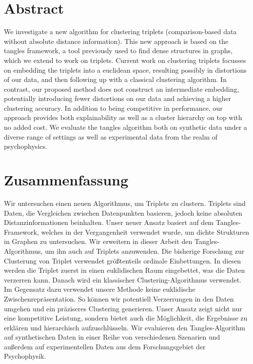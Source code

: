 \documentclass[twoside,12pt,a4paper]{report}
\begin{document}

\setcounter{page}{1}



\section*{Abstract}
We investigate a new algorithm for clustering triplets (comparison-based data 
without absolute distance information). This new approach is based on the tangles framework,
a tool previously used to find dense structures in graphs, which 
we extend to work on triplets. Current work on clustering triplets focusses
on embedding the triplets into a euclidean space, resulting possibly in distortions of our data,
and then following up with a classical clustering algorithm. In contrast, our proposed method
does not construct an intermediate embedding, potentially introducing fewer distortions
on our data and achieving a higher clustering accuracy. In addition to being
competitive in performance, our approach provides both explainability as well as a cluster 
hierarchy on top with no added cost. We evaluate the tangles algorithm both on synthetic data 
under a diverse range of settings as well as experimental data from the realm of psychophysics.

\newpage
\section*{Zusammenfassung}
Wir untersuchen einen neuen Algorithmus, um Triplets zu clustern. Triplets sind Daten, die 
Vergleichen zwischen Datenpunkten basieren, jedoch keine absoluten Distanzinformationen beinhalten. Unser neuer Ansatz basiert
auf dem Tangles-Framework, welches in der Vergangenheit verwendet wurde, um dichte Strukturen in Graphen 
zu untersuchen. Wir erweitern in dieser Arbeit den Tangles-Algorithmus, um ihn auch auf Triplets anzuwenden.
Die bisherige Forschung zur Clusterung von Triplet verwendet größtenteils ordinale Einbettungen. In diesen 
werden die Triplet zuerst in einen euklidischen Raum eingebettet, was die Daten verzerren kann. 
Danach wird ein klassischer Clustering-Algorithmus verwendet. Im Gegensatz dazu verwendet unsere Methode keine euklidische Zwischenrepräsentation.
So können wir potentiell Verzerrungen in den Daten umgehen und ein präziseres Clustering generieren. 
Unser Ansatz zeigt nicht nur eine kompetitive Leistung, sondern bietet auch die Möglichkeit, die Ergebnisse zu erklären und 
hierarchisch aufzuschlüsseln. Wir evaluieren den Tangles-Algorithm auf synthetischen Daten in einer Reihe von verschiedenen Szenarien
und außerdem auf experimentellen Daten aus dem Forschungsgebiet der Psychophysik.
\end{document}
